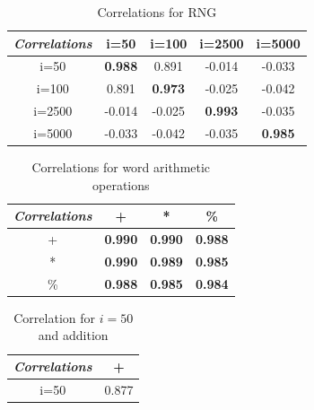 \begin{table}
\centering
\begin{tabular}{|c|cccc}
\hline
\textit{\textbf{Correlations}} & \multicolumn{1}{c|}{i=50} & \multicolumn{1}{c|}{i=100} & \multicolumn{1}{c|}{i=2500} & \multicolumn{1}{c|}{i=5000} \\ \hline
i=50                           & \textbf{0.988}            & 0.891                      & -0.014                      & -0.033                      \\ \cline{1-1}
i=100                          & 0.891                     & \textbf{0.973}             & -0.025                      & -0.042                      \\ \cline{1-1}
i=2500                         & -0.014                    & -0.025                     & \textbf{0.993}              & -0.035                      \\ \cline{1-1}
i=5000                         & -0.033                    & -0.042                     & -0.035                      & \textbf{0.985}              \\ \cline{1-1}
\end{tabular}
\caption{Correlations for RNG}
\label{Tbl: pingload RNG}
\end{table}

\begin{table}
\centering
\begin{tabular}{|c|ccc}
\hline
\textit{\textbf{Correlations}} & \multicolumn{1}{c|}{+} & \multicolumn{1}{c|}{*} & \multicolumn{1}{c|}{\%} \\ \hline
+                              & \textbf{0.990}         & \textbf{0.990}         & \textbf{0.988}          \\ \cline{1-1}
*                              & \textbf{0.990}         & \textbf{0.989}         & \textbf{0.985}          \\ \cline{1-1}
\%                             & \textbf{0.988}         & \textbf{0.985}         & \textbf{0.984}          \\ \cline{1-1}
\end{tabular}
\caption{Correlations for word arithmetic operations}
\label{Tbl: pingload arth}
\end{table}

\begin{table}[]
\centering
\begin{tabular}{|c|c|}
\hline
\textbf{\textit {Correlations}} & +     \\ \hline
i=50         & 0.877 \\ \hline
\end{tabular}
\caption{Correlation for $i=50$ and addition}
\label{Tbl: pingload rng arth}
\end{table}

